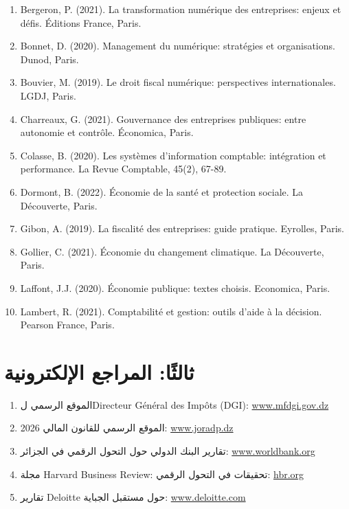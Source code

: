 \documentclass[12pt, a4paper, twoside]{report}
\begin{document}
\begin{enumerate}
    \item Bergeron, P. (2021). La transformation numérique des entreprises: enjeux et défis. Éditions France, Paris.
    \item Bonnet, D. (2020). Management du numérique: stratégies et organisations. Dunod, Paris.
    \item Bouvier, M. (2019). Le droit fiscal numérique: perspectives internationales. LGDJ, Paris.
    \item Charreaux, G. (2021). Gouvernance des entreprises publiques: entre autonomie et contrôle. Économica, Paris.
    \item Colasse, B. (2020). Les systèmes d'information comptable: intégration et performance. La Revue Comptable, 45(2), 67-89.
    \item Dormont, B. (2022). Économie de la santé et protection sociale. La Découverte, Paris.
    \item Gibon, A. (2019). La fiscalité des entreprises: guide pratique. Eyrolles, Paris.
    \item Gollier, C. (2021). Économie du changement climatique. La Découverte, Paris.
    \item Laffont, J.J. (2020). Économie publique: textes choisis. Economica, Paris.
    \item Lambert, R. (2021). Comptabilité et gestion: outils d'aide à la décision. Pearson France, Paris.
\end{enumerate}

\section*{ثالثًا: المراجع الإلكترونية}

\begin{enumerate}
    \item الموقع الرسمي لDirecteur Général des Impôts (DGI): \url{www.mfdgi.gov.dz}
    \item الموقع الرسمي للقانون المالي 2026: \url{www.joradp.dz}
    \item تقارير البنك الدولي حول التحول الرقمي في الجزائر: \url{www.worldbank.org}
    \item مجلة Harvard Business Review: تحقيقات في التحول الرقمي: \url{hbr.org}
    \item تقارير Deloitte حول مستقبل الجباية: \url{www.deloitte.com}
\end{enumerate}

\newpage
\end{document}
